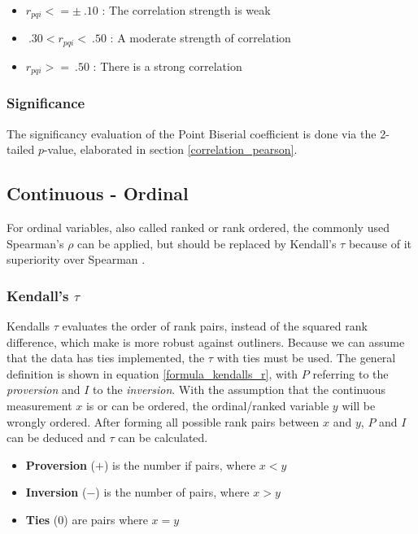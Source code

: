 \documentclass[a4paper,12pt]{report}
\begin{document}
\begin{itemize}
	\item $r_{pqi} <= \pm \: .10$ : The correlation strength is weak
	\item $\: .30 < r_{pqi} < \: .50$ : A moderate strength of correlation
	\item $r_{pqi} >= \: .50$ : There is a strong correlation
\end{itemize}

\subsubsection{Significance}
The significancy evaluation of the Point Biserial coefficient is done via the 2-tailed $p$-value, elaborated in section \ref{correlation_pearson}.

\subsection{Continuous - Ordinal}
For ordinal variables, also called ranked or rank ordered, the commonly used Spearman's $\rho$ can be applied, but should be replaced by Kendall's $\tau$ because of it superiority over Spearman \cite{Newson2002}. 

\subsubsection{Kendall's $\tau$}
Kendalls $\tau$ evaluates the order of rank pairs, instead of the squared rank difference, which make is more robust against outliners. Because we can assume that the data has ties implemented, the $\tau$ with ties must be used. The general definition is shown in equation \ref{formula_kendalls_r}, with $P$ referring to the \textit{proversion} and $I$ to the \textit{inversion}. With the assumption that the continuous measurement $x$ is or can be ordered, the ordinal/ranked variable $y$ will be wrongly ordered. After forming all possible rank pairs between $x$ and $y$, $P$ and $I$ can be deduced and $\tau$ can be calculated. \cite{Reiter2015}

\begin{itemize}	
	\item[] \textbf{Proversion} ($+$) is the number if pairs, where $x < y$ 
	\item[] \textbf{Inversion} ($-$) is the number of pairs, where $x > y$ 
	\item[] \textbf{Ties} ($0$) are pairs where $x = y$
\end{itemize}
\end{document}
